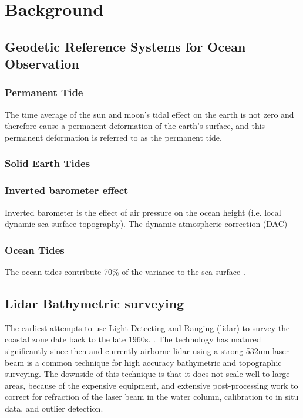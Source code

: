 
\chapter{Background}

\section{Geodetic Reference Systems for Ocean Observation}
\subsection{Permanent Tide}
The time average of the sun and moon's tidal effect on the earth is not zero and therefore cause a permanent deformation of the earth's surface, and this permanent deformation is referred to as the permanent tide. 

\subsection{Solid Earth Tides}
\subsection{Inverted barometer effect}
Inverted barometer is the effect of air pressure on the ocean height (i.e. local dynamic sea-surface topography)\parencite{comparison guide}. The dynamic atmospheric correction (DAC) 
\subsection{Ocean Tides}

The ocean tides contribute 70\% of the variance to the sea surface \parencite{icesat2 comparison guide}.


\section{Lidar Bathymetric surveying}

The earliest attempts to use Light Detecting and Ranging (lidar) to survey the coastal zone date back to the late 1960s. \parencite{Bailly2016}. The technology has matured significantly since then and currently airborne lidar using a strong 532nm laser beam is a common technique for high accuracy bathymetric and topographic surveying. The downside of this technique is that it does not scale well to large areas, because of the expensive equipment, and extensive post-processing work to correct for refraction of the laser beam in the water column, calibration to in situ data, and outlier detection.

